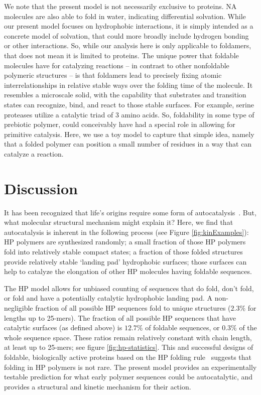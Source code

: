\documentclass[5p,times]{elsarticle}
\begin{document}
We note that the present model is not necessarily exclusive to proteins.  NA molecules are also 
able 
to fold in water, indicating differential solvation.  While our present model focuses on 
hydrophobic interactions, it is simply intended as a concrete model of solvation, that could more 
broadly include hydrogen bonding or other interactions.  So, while our analysis here is only 
applicable to foldamers, that does not mean it is limited to proteins.  The unique power that 
foldable molecules have for catalyzing reactions -- in contrast to other nonfoldable polymeric 
structures -- is that foldamers lead to precisely fixing atomic interrelationships in relative 
stable ways over the folding time of the molecule.  It resembles a microscale solid, with the 
capability that substrates and transition states can recognize, bind, and react to those stable 
surfaces. For example, serine proteases utilize a catalytic triad of 3 amino acids.  So, 
foldability 
in some type of prebiotic polymer, could conceivably have had a special role in allowing for 
primitive catalysis.  Here, we use a toy model to capture that simple idea, namely that a folded 
polymer can position a small number of residues in a way that can catalyze a reaction.



\section{Discussion}
\label{sec:evolution}
 It has been recognized that life's origins require some form of 
autocatalysis~\cite{Kauffman1986,Dyson1985,Eigen1978}.  But, what molecular structural mechanism 
might explain it?  Here, we find that autocatalysis is inherent in the following process (see 
Figure \ref{fig:kinExamples}):  HP polymers 
are synthesized randomly; a small fraction of those HP polymers fold into relatively stable 
compact 
states; a fraction of those folded structures provide relatively stable `landing pad' hydrophobic 
surfaces; those surfaces can help to catalyze the elongation of other HP molecules having foldable 
sequences.

 The HP model allows for unbiased counting of sequences that do fold, don't fold, or fold and have 
a potentially catalytic hydrophobic landing pad.  A non-negligible fraction of all possible HP 
sequences fold to unique structures ($2.3\% $ for lengths up to 25-mers). The fraction of all 
possible HP sequences that have catalytic surfaces (as defined above) is $12.7\%$ of foldable 
sequences, or $0.3\%$ of the whole sequence space.  These ratios remain relatively constant with 
chain length, at least up to 25-mers; see figure \ref{fig:hp-statistics}.  This and successful 
designs of foldable, biologically active proteins based on the HP folding rule~\cite{Murphy2015} 
suggests that folding in HP polymers is not rare.  
   The present model provides an experimentally testable prediction for what early 
  polymer sequences could be autocatalytic, and provides a structural and kinetic mechanism for 
their action. 
\end{document}

